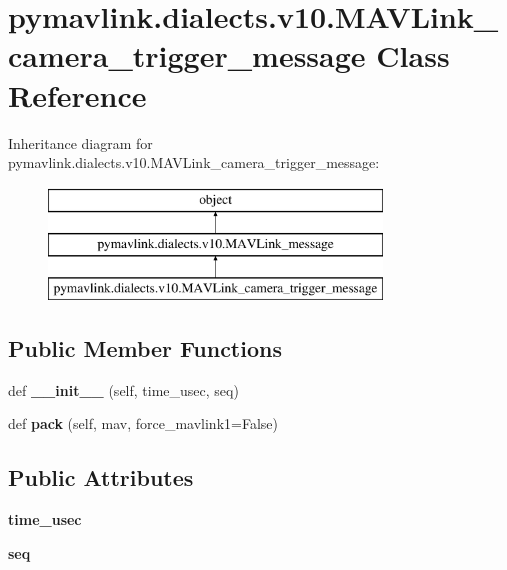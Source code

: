 \hypertarget{classpymavlink_1_1dialects_1_1v10_1_1MAVLink__camera__trigger__message}{}\section{pymavlink.\+dialects.\+v10.\+M\+A\+V\+Link\+\_\+camera\+\_\+trigger\+\_\+message Class Reference}
\label{classpymavlink_1_1dialects_1_1v10_1_1MAVLink__camera__trigger__message}
Inheritance diagram for pymavlink.\+dialects.\+v10.\+M\+A\+V\+Link\+\_\+camera\+\_\+trigger\+\_\+message\+:\begin{figure}[H]
\begin{center}
\leavevmode
\includegraphics[height=3.000000cm]{classpymavlink_1_1dialects_1_1v10_1_1MAVLink__camera__trigger__message}
\end{center}
\end{figure}
\subsection*{Public Member Functions}
\begin{DoxyCompactItemize}
\item 
\mbox{\label{classpymavlink_1_1dialects_1_1v10_1_1MAVLink__camera__trigger__message_a2ea0320651aa52dd776bd75033a84f8b}} 
def {\bfseries \+\_\+\+\_\+init\+\_\+\+\_\+} (self, time\+\_\+usec, seq)
\item 
\mbox{\label{classpymavlink_1_1dialects_1_1v10_1_1MAVLink__camera__trigger__message_ac0ec05aacdb1cd7abf22f176076f4e8e}} 
def {\bfseries pack} (self, mav, force\+\_\+mavlink1=False)
\end{DoxyCompactItemize}
\subsection*{Public Attributes}
\begin{DoxyCompactItemize}
\item 
\mbox{\label{classpymavlink_1_1dialects_1_1v10_1_1MAVLink__camera__trigger__message_aa96e9e09e536f34ab3ef06fe66b4b5ef}} 
{\bfseries time\+\_\+usec}
\item 
\mbox{\label{classpymavlink_1_1dialects_1_1v10_1_1MAVLink__camera__trigger__message_a43d776369c4fc6c6de8f8d2d114a2b28}} 
{\bfseries seq}
\end{DoxyCompactItemize}
